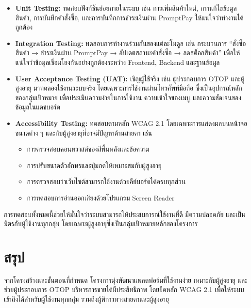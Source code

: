 \begin{itemize}
  \item \textbf{Unit Testing:}  
  ทดสอบฟังก์ชันย่อยภายในระบบ เช่น  
  การเพิ่มสินค้าใหม่, การแก้ไขข้อมูลสินค้า, การบันทึกคำสั่งซื้อ, 
  และการบันทึกการชำระเงินผ่าน PromptPay ให้แน่ใจว่าทำงานได้ถูกต้อง

  \item \textbf{Integration Testing:}  
  ทดสอบการทำงานร่วมกันของแต่ละโมดูล เช่น  
  กระบวนการ “สั่งซื้อสินค้า → ชำระเงินผ่าน PromptPay → อัปเดตสถานะคำสั่งซื้อ → ลดสต็อกสินค้า”  
  เพื่อให้แน่ใจว่าข้อมูลเชื่อมโยงกันอย่างถูกต้องระหว่าง Frontend, Backend และฐานข้อมูล

  \item \textbf{User Acceptance Testing (UAT):}  
  เชิญผู้ใช้จริง เช่น ผู้ประกอบการ OTOP และผู้สูงอายุ มาทดลองใช้งานระบบจริง  
  โดยเฉพาะการใช้งานผ่านโทรศัพท์มือถือ ซึ่งเป็นอุปกรณ์หลักของกลุ่มเป้าหมาย  
  เพื่อประเมินความง่ายในการใช้งาน ความเข้าใจของเมนู และความชัดเจนของข้อมูลในแดชบอร์ด

  \item \textbf{Accessibility Testing:}  
  ทดสอบตามหลัก WCAG 2.1 โดยเฉพาะการแสดงผลบนหน้าจอขนาดต่าง ๆ  
  และกับผู้สูงอายุที่อาจมีปัญหาด้านสายตา เช่น  
  \begin{itemize}
      \item การตรวจสอบคอนทราสต์ของสีพื้นหลังและข้อความ  
      \item การปรับขนาดตัวอักษรและปุ่มกดให้เหมาะสมกับผู้สูงอายุ  
      \item การตรวจสอบว่าเว็บไซต์สามารถใช้งานด้วยคีย์บอร์ดได้ครบทุกส่วน  
      \item การทดสอบการอ่านออกเสียงด้วยโปรแกรม Screen Reader  
  \end{itemize}
\end{itemize}

การทดสอบทั้งหมดนี้ช่วยให้มั่นใจว่าระบบสามารถให้ประสบการณ์ใช้งานที่ดี 
มีความปลอดภัย และเป็นมิตรกับผู้ใช้งานทุกกลุ่ม โดยเฉพาะผู้สูงอายุซึ่งเป็นกลุ่มเป้าหมายหลักของโครงการ


\section{สรุป}
จากโครงสร้างและขั้นตอนที่กำหนด โครงการมุ่งพัฒนาแพลตฟอร์มที่ใช้งานง่าย \cite{ecommerce2019}
เหมาะกับผู้สูงอายุ และช่วยผู้ประกอบการ OTOP บริหารการขายได้มีประสิทธิภาพ \cite{otop2020}
โดยยึดหลัก WCAG 2.1 เพื่อให้ระบบเข้าถึงได้สำหรับผู้ใช้งานทุกกลุ่ม 
รวมถึงผู้พิการทางสายตาและผู้สูงอายุ
